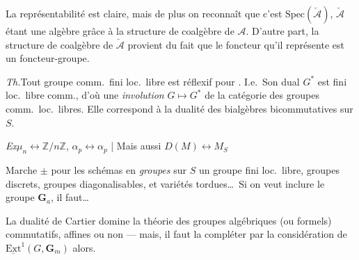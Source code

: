 \documentclass[11pt,a4paper]{article}
\begin{document}
\struck{\ill{}} La représentabilité est claire, mais de plus on reconnaît que
c'est $\mathrm{Spec}(\check{\mathcal{A}})$, $\check{\mathcal{A}}$
 étant une algèbre grâce à la structure de
coalgèbre de $\mathcal{A}$. D'autre part, la structure de coalgèbre de
$\check{\mathcal{A}}$ provient du fait que le foncteur qu'il représente est
un foncteur-groupe.

\emph{Th.}\quad Tout groupe comm.\ fini loc.\ libre  est réflexif
pour . I.e.\ Son dual $G^{*}$ est fini loc.\ libre comm.,
d'où une \emph{involution} $G \mapsto G^{*}$ de la catégorie des
groupes comm.\ loc.\ libres. Elle correspond à la dualité des bialgèbres
bicommutatives sur $S$.

\emph{Ex}\quad $\mu_n \leftrightarrow \mathbb{Z}/n\mathbb{Z}$,\quad
$\alpha_p \leftrightarrow \alpha_p$ \quad | \quad Mais aussi
$D(M) \longleftrightarrow M_S$

Marche $\pm$ pour les schémas en \emph{groupes}  \ill{}
sur $S$  \add{\ill{}} \ill{} un groupe fini loc.\ libre,
groupes discrets, groupes diagonalisables, et variétés 
tordues…\ Si on veut inclure le groupe $\mathbf{G}_a$, il faut…

La dualité de Cartier domine la théorie des groupes algébriques (ou
formels) commutatifs, affines ou non --- mais, il faut la compléter par la
considération de $\underline{\mathrm{Ext}}^1(G, \mathbf{G}_m)$ alors.
\end{document}
